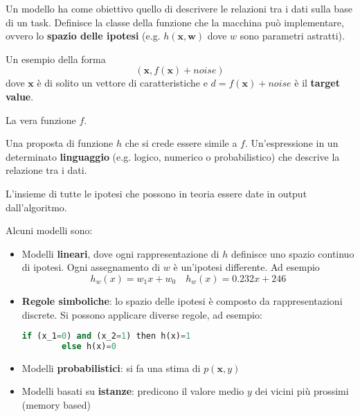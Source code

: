 \begin{definition}[Modello]
	Un modello ha come obiettivo quello di descrivere le relazioni tra i dati sulla base di un task. Definisce la classe della funzione che la macchina può implementare, ovvero lo \textbf{spazio delle ipotesi} (e.g. $h(\textbf{x}, \textbf{w})$ dove $w$ sono parametri astratti).
\end{definition}
\begin{definition}
	Un esempio della forma
	\begin{equation*}
		(\textbf{x}, f(\textbf{x})+noise)
	\end{equation*}
	dove $\textbf{x}$ è di solito un vettore di caratteristiche e $d=f(\textbf{x})+noise$ è il \textbf{target value}.
\end{definition}
\begin{definition}
	La vera funzione $f$.
\end{definition}
\begin{definition}[Ipotesi]
	Una proposta di funzione $h$ che si crede essere simile a $f$. Un'espressione in un determinato \textbf{linguaggio} (e.g. logico, numerico o probabilistico) che descrive la relazione tra i dati.
\end{definition}
\begin{definition}
	L'insieme di tutte le ipotesi che possono in teoria essere date in output dall'algoritmo.
\end{definition}

\noindent Alcuni modelli sono:
\begin{itemize}
	\item Modelli \textbf{lineari}, dove ogni rappresentazione di $h$ definisce uno spazio continuo di ipotesi. Ogni assegnamento di \textbf{$w$} è un'ipotesi differente. Ad esempio
	\begin{equation*}
		h_w(x)=w_1x+w_0 \quad h_w(x) = 0.232x + 246
	\end{equation*}
	\item \textbf{Regole simboliche}: lo spazio delle ipotesi è composto da rappresentazioni discrete. Si possono applicare diverse regole, ad esempio:
	\begin{lstlisting}[language=Python]
		if (x_1=0) and (x_2=1) then h(x)=1
		else h(x)=0
	\end{lstlisting}
	\item Modelli \textbf{probabilistici}: si fa una stima di $p(\textbf{x},y)$
	\item Modelli basati su \textbf{istanze}: predicono il valore medio $y$ dei vicini più prossimi (memory based)
\end{itemize}

